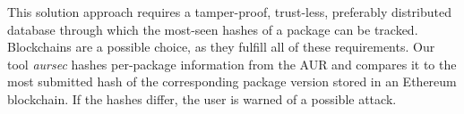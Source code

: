 This solution approach requires a tamper-proof, trust-less, preferably distributed database through which the most-seen hashes of a package can be tracked. Blockchains are a possible choice, as they fulfill all of these requirements.
Our tool \emph{aursec} hashes per-package information from the AUR and compares it to the most submitted hash of the corresponding package version stored in an Ethereum blockchain.
If the hashes differ, the user is warned of a possible attack.



